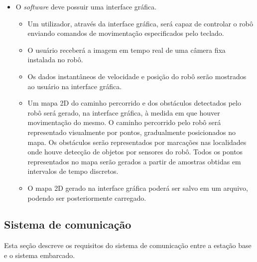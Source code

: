 \begin{itemize}
  \item O \textit{software} deve possuir uma interface gráfica.
    \begin{itemize}
      \item Um utilizador, através da interface gráfica, será capaz de controlar o robô enviando comandos de movimentação especificados pelo teclado. 
      \item O usuário receberá a imagem em tempo real de uma câmera fixa instalada no robô. 
      \item Os dados instantâneos de velocidade e posição do robô serão mostrados ao usuário na interface gráfica.
      \item Um mapa 2D do caminho percorrido e dos obstáculos detectados pelo robô será gerado, na interface gráfica, à medida em que houver movimentação do mesmo. O caminho percorrido pelo robô será representado visualmente por pontos, gradualmente posicionados no mapa. Os obstáculos serão representados por marcações nas localidades onde houve detecção de objetos por sensores do robô. Todos os pontos representados no mapa serão gerados a partir de amostras obtidas em intervalos de tempo discretos.
      \item O mapa 2D gerado na interface gráfica poderá ser salvo em um arquivo, podendo ser posteriormente carregado.
    \end{itemize}

\end{itemize} %



\subsection{Sistema de comunicação}
Esta seção descreve os requisitos do sistema de comunicação entre a estação base e o sistema embarcado.

